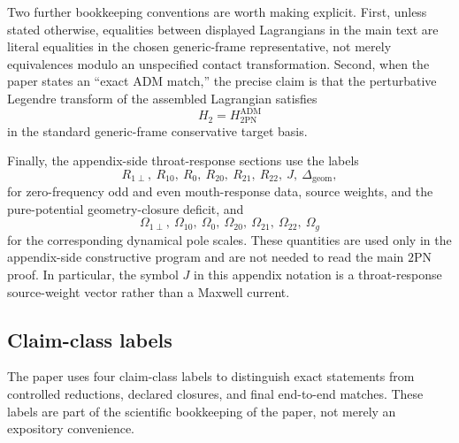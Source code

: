 \documentclass[11pt]{article}
\newcommand{\TwoPN}{\mathrm{2PN}}
\newcommand{\ADM}{\mathrm{ADM}}
\newcommand{\geom}{\mathrm{geom}}
\begin{document}
Two further bookkeeping conventions are worth making explicit.
First, unless stated otherwise, equalities between displayed Lagrangians in the main text
are literal equalities in the chosen generic-frame representative, not merely equivalences
modulo an unspecified contact transformation.  Second, when the paper states an “exact
\(\ADM\) match,” the precise claim is that the perturbative Legendre transform of the
assembled Lagrangian satisfies
\begin{equation}
H_2=H_{2\mathrm{PN}}^{\ADM}
\label{eq:notation-2pn-exact-adm}
\end{equation}
in the standard generic-frame conservative target basis.

Finally, the appendix-side throat-response sections use the labels
\begin{equation}
R_{1\perp},\ R_{10},\ R_0,\ R_{20},\ R_{21},\ R_{22},\ J,\ \Delta_{\geom},
\label{eq:notation-2pn-throat-symbols}
\end{equation}
for zero-frequency odd and even mouth-response data, source weights, and the
pure-potential geometry-closure deficit, and
\begin{equation}
\Omega_{1\perp},\ \Omega_{10},\ \Omega_0,\ \Omega_{20},\ \Omega_{21},\ \Omega_{22},\ \Omega_g
\label{eq:notation-2pn-pole-symbols}
\end{equation}
for the corresponding dynamical pole scales.  These quantities are used only in the
appendix-side constructive program and are not needed to read the main \(\TwoPN\) proof.
In particular, the symbol \(J\) in this appendix notation is a throat-response
source-weight vector rather than a Maxwell current.

\subsection{Claim-class labels}
\label{app:notation-claims}

The paper uses four claim-class labels to distinguish exact statements from controlled
reductions, declared closures, and final end-to-end matches.  These labels are part of the
scientific bookkeeping of the paper, not merely an expository convenience.
\end{document}
